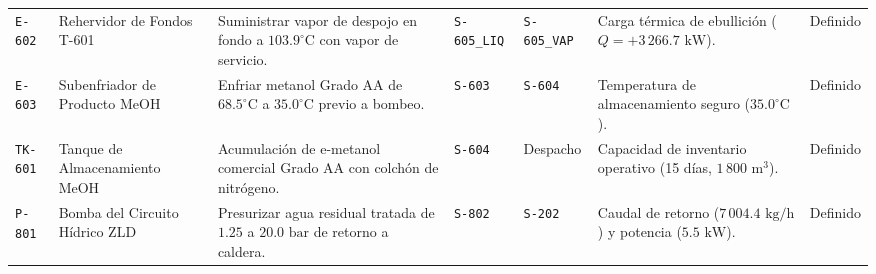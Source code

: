 \documentclass[10pt,letterpaper]{article}
\begin{document}
\begin{landscape}
\begin{xltabular}{\linewidth}{l >{\raggedright\arraybackslash}p{3.2cm} >{\raggedright\arraybackslash}X >{\centering\arraybackslash}p{2.0cm} >{\centering\arraybackslash}p{2.2cm} >{\raggedright\arraybackslash}p{4.5cm} c}
\texttt{E-602} & Rehervidor de Fondos T-601 & Suministrar vapor de despojo en fondo a $103.9^\circ\text{C}$ con vapor de servicio. & \texttt{S-605\_LIQ} & \texttt{S-605\_VAP} & Carga térmica de ebullición ($Q=+3\,266.7\text{ kW}$). & Definido \\
\texttt{E-603} & Subenfriador de Producto MeOH & Enfriar metanol Grado AA de $68.5^\circ\text{C}$ a $35.0^\circ\text{C}$ previo a bombeo. & \texttt{S-603} & \texttt{S-604} & Temperatura de almacenamiento seguro ($35.0^\circ\text{C}$). & Definido \\
\texttt{TK-601} & Tanque de Almacenamiento MeOH & Acumulación de e-metanol comercial Grado AA con colchón de nitrógeno. & \texttt{S-604} & Despacho & Capacidad de inventario operativo (15 días, $1\,800\text{ m}^3$). & Definido \\
\texttt{P-801} & Bomba del Circuito Hídrico ZLD & Presurizar agua residual tratada de $1.25$ a $20.0\text{ bar}$ de retorno a caldera. & \texttt{S-802} & \texttt{S-202} & Caudal de retorno ($7\,004.4\text{ kg/h}$) y potencia ($5.5\text{ kW}$). & Definido \\
\end{xltabular}
\end{landscape}
\end{document}
